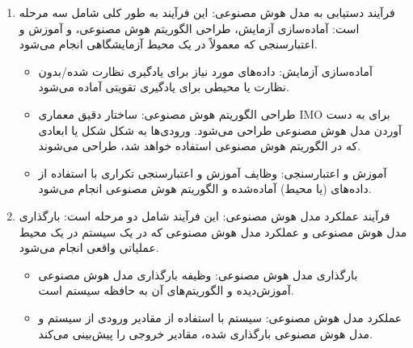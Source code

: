 \documentclass[a4paper,10pt]{article}
\begin{document}
                \begin{enumerate}
                    
                    \item فرآیند دستیابی به مدل هوش مصنوعی: این فرآیند به طور کلی شامل سه مرحله است: آماده‌سازی آزمایش، طراحی الگوریتم هوش مصنوعی، و آموزش و اعتبارسنجی که معمولاً در یک محیط آزمایشگاهی انجام می‌شود.
                    
                    \begin{itemize}
                        
                        \item آماده‌سازی آزمایش: داده‌های مورد نیاز برای یادگیری نظارت شده/بدون نظارت یا محیطی برای یادگیری تقویتی آماده می‌شود.

                        \item طراحی الگوریتم هوش مصنوعی: ساختار دقیق معماری IMO برای به دست آوردن مدل هوش مصنوعی طراحی می‌شود. ورودی‌ها به شکل شکل یا ابعادی که در الگوریتم هوش مصنوعی استفاده خواهد شد، طراحی می‌شوند.

                        \item آموزش و اعتبارسنجی: وظایف آموزش و اعتبارسنجی تکراری با استفاده از داده‌های (یا محیط) آماده‌شده و الگوریتم هوش مصنوعی انجام می‌شود.
                        
                    \end{itemize}

                    \item فرآیند عملکرد مدل هوش مصنوعی: این فرآیند شامل دو مرحله است: بارگذاری مدل هوش مصنوعی و عملکرد مدل هوش مصنوعی که در یک سیستم در یک محیط عملیاتی واقعی انجام می‌شود.

                    \begin{itemize}
                        
                        \item بارگذاری مدل هوش مصنوعی: وظیفه بارگذاری مدل هوش مصنوعی آموزش‌دیده و الگوریتم‌های آن به حافظه سیستم است.

                        \item عملکرد مدل هوش مصنوعی: سیستم با استفاده از مقادیر ورودی از سیستم و مدل هوش مصنوعی بارگذاری شده، مقادیر خروجی را پیش‌بینی می‌کند.

                    \end{itemize}

                \end{enumerate}
\end{document}
